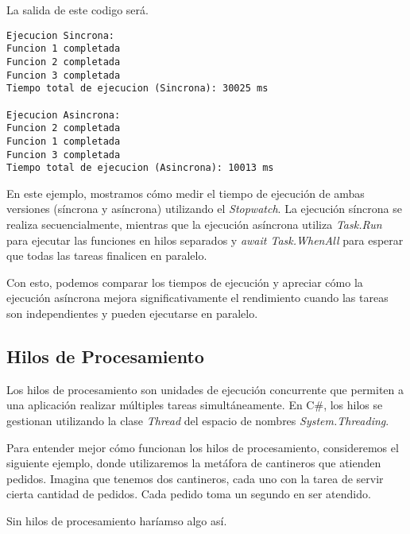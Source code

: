 \documentclass[executivepaper]{article}
\begin{document}
La salida de este codigo será.

\begin{verbatim}
Ejecucion Sincrona:
Funcion 1 completada
Funcion 2 completada
Funcion 3 completada
Tiempo total de ejecucion (Sincrona): 30025 ms

Ejecucion Asincrona:
Funcion 2 completada
Funcion 1 completada
Funcion 3 completada
Tiempo total de ejecucion (Asincrona): 10013 ms
\end{verbatim}

En este ejemplo, mostramos cómo medir el tiempo de ejecución de ambas versiones (síncrona y asíncrona) utilizando el \emph{Stopwatch}. La ejecución síncrona se realiza secuencialmente, mientras que la ejecución asíncrona utiliza \emph{Task.Run} para ejecutar las funciones en hilos separados y \emph{await Task.WhenAll} para esperar que todas las tareas finalicen en paralelo.

Con esto, podemos comparar los tiempos de ejecución y apreciar cómo la ejecución asíncrona mejora significativamente el rendimiento cuando las tareas son independientes y pueden ejecutarse en paralelo.

\subsection{Hilos de Procesamiento}

Los hilos de procesamiento son unidades de ejecución concurrente que permiten a una aplicación realizar múltiples tareas simultáneamente. En C\#, los hilos se gestionan utilizando la clase \emph{Thread} del espacio de nombres \emph{System.Threading}.

Para entender mejor cómo funcionan los hilos de procesamiento, consideremos el siguiente ejemplo, donde utilizaremos la metáfora de cantineros que atienden pedidos. Imagina que tenemos dos cantineros, cada uno con la tarea de servir cierta cantidad de pedidos. Cada pedido toma un segundo en ser atendido.

Sin hilos de procesamiento haríamso algo así.
\end{document}
